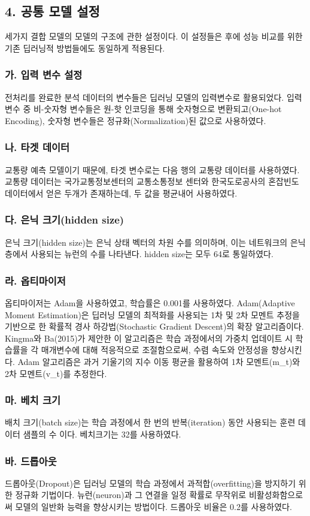 \documentclass[11pt]{report}
\begin{document}
\subsection*{4. 공통 모델 설정}
세가지 결합 모델의 모델의 구조에 관한 설정이다. 
이 설정들은 후에 성능 비교를 위한 기존 딥러닝적 방법들에도 동일하게 적용된다. 
\subsubsection*{가. 입력 변수 설정}
전처리를 완료한 분석 데이터의 변수들은 딥러닝 모델의 입력변수로 활용되었다. 
입력 변수 중 비-숫자형 변수들은 원-핫 인코딩을 통해 숫자형으로 변환되고(One-hot Encoding), 숫자형 변수들은 정규화(Normalization)된 값으로 사용하였다. 
\subsubsection*{나. 타겟 데이터}
교통량 예측 모델이기 때문에, 타겟 변수로는 다음 행의 교통량 데이터를 사용하였다. 
교통량 데이터는 국가교통정보센터의 교통소통정보 센터와 한국도로공사의 혼잡빈도 데이터에서 얻은 두개가 존재하는데, 
두 값을 평균내어 사용하였다. 
\subsubsection*{다. 은닉 크기(hidden size)}
은닉 크기(hidden size)는 은닉 상태 벡터의 차원 수를 의미하며, 이는 네트워크의 은닉층에서 사용되는 뉴런의 수를 나타낸다. 
hidden size는 모두 64로 통일하였다. 
\subsubsection*{라. 옵티마이저}
옵티마이저는 Adam을 사용하였고, 학습률은 0.001를 사용하였다. 
Adam(Adaptive Moment Estimation)은 딥러닝 모델의 최적화를 사용되는 1차 및 2차 모멘트 추정을 기반으로 한 확률적 경사 하강법(Stochastic Gradient Descent)의 확장 알고리즘이다. 
Kingma와 Ba(2015)가 제안한 이 알고리즘은 학습 과정에서의 가중치 업데이트 시 학습률을 각 매개변수에 대해 적응적으로 조절함으로써, 수렴 속도와 안정성을 향상시킨다.
Adam 알고리즘은 과거 기울기의 지수 이동 평균을 활용하여 1차 모멘트(m\_t)와 2차 모멘트(v\_t)를 추정한다. 
\subsubsection*{마. 베치 크기}
배치 크기(batch size)는 학습 과정에서 한 번의 반복(iteration) 동안 사용되는 훈련 데이터 샘플의 수 이다. 
베치크기는 32를 사용하였다. 
\subsubsection*{바. 드롭아웃}
드롭아웃(Dropout)은 딥러닝 모델의 학습 과정에서 과적합(overfitting)을 방지하기 위한 정규화 기법이다. 
뉴런(neuron)과 그 연결을 일정 확률로 무작위로 비활성화함으로써 모델의 일반화 능력을 향상시키는 방법이다. 
드롭아웃 비율은 0.2를 사용하였다. 
\end{document}
